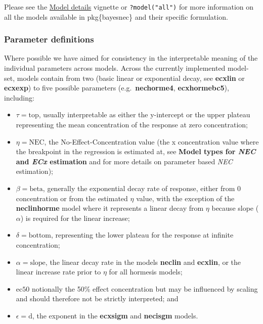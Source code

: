 \documentclass[
]{jss}
\begin{document}
Please see the
\href{https://open-aims.github.io/bayesnec/articles/example2b.html}{Model
details} vignette or \texttt{?model("all")} for more information on all
the models available in pkg\{bayesnec\} and their specific formulation.

\hypertarget{parameter-definitions}{%
\subsubsection{Parameter definitions}\label{parameter-definitions}}

Where possible we have aimed for consistency in the interpretable
meaning of the individual parameters across models. Across the currently
implemented model-set, models contain from two (basic linear or
exponential decay, see \textbf{ecxlin} or \textbf{ecxexp}) to five
possible parameters (e.g.~\textbf{nechorme4}, \textbf{ecxhormebc5}),
including:

\begin{itemize}
\item
  \(\tau = \text{top}\), usually interpretable as either the y-intercept
  or the upper plateau representing the mean concentration of the
  response at zero concentration;
\item
  \(\eta = \text{NEC}\), the No-Effect-Concentration value (the x
  concentration value where the breakpoint in the regression is
  estimated at, see \textbf{Model types for \emph{NEC} and \emph{ECx}
  estimation} and \citep{Fox2010} for more details on parameter based
  \emph{NEC} estimation);
\item
  \(\beta = \text{beta}\), generally the exponential decay rate of
  response, either from 0 concentration or from the estimated \(\eta\)
  value, with the exception of the \textbf{neclinhorme} model where it
  represents a linear decay from \(\eta\) because slope (\(\alpha\)) is
  required for the linear increase;
\item
  \(\delta = \text{bottom}\), representing the lower plateau for the
  response at infinite concentration;
\item
  \(\alpha = \text{slope}\), the linear decay rate in the models
  \textbf{neclin} and \textbf{ecxlin}, or the linear increase rate prior
  to \(\eta\) for all hormesis models;
\item
  \(\text{ec50}\) notionally the 50\% effect concentration but may be
  influenced by scaling and should therefore not be strictly
  interpreted; and
\item
  \(\epsilon = \text{d}\), the exponent in the \textbf{ecxsigm} and
  \textbf{necisgm} models.
\end{itemize}
\end{document}
